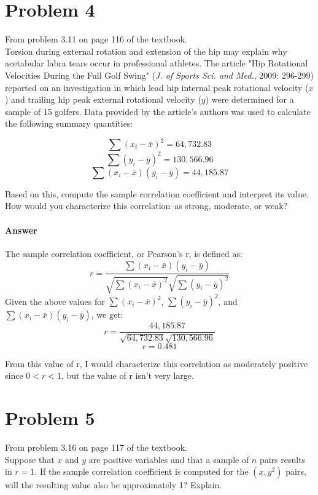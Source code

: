\documentclass{article}
\newcommand{\p}[1]{\paragraph{#1}} %
\begin{document}
\section*{Problem 4} %

	From problem 3.11 on page 116 of the textbook. \\

	Torsion during external rotation and extension of the hip may explain why acetabular labra tears 
	occur in professional athletes. The article "Hip Rotational Velocities During the Full Golf 
	Swing" (\textit{J. of Sports Sci. and Med.}, 2009: 296-299) reported on an investigation in which 
	lead hip internal peak rotational velocity ($x$) and trailing hip peak external rotational velocity 
	($y$) were determined for a sample of 15 golfers. Data provided by the article's authors was 
	used to calculate the following summary quantities:
	
	\[ \sum(x_i-\bar{x})^2 = 64,732.83 \]
	\[ \sum(y_i-\bar{y})^2 = 130,566.96 \]
	\[ \sum(x_i-\bar{x})(y_i-\bar{y}) = 44,185.87 \]
	
	Based on this, compute the sample correlation coefficient and interpret its value. How would 
	you characterize this correlation--as strong, moderate, or weak?
	
	\p{Answer} The sample correlation coefficient, or Pearson's r, is defined as:
	\[ r = \frac{\sum(x_i-\bar{x})(y_i-\bar{y})}{\sqrt{\sum(x_i-\bar{x})^2}\sqrt{\sum(y_i-\bar{y})^2}} \]
	Given the above values for $\sum(x_i-\bar{x})^2$, $\sum(y_i-\bar{y})^2$, and $\sum(x_i-\bar{x})
	(y_i-\bar{y})$, we get:
	\[ r = \frac{44,185.87}{\sqrt{64,732.83}\sqrt{130,566.96}} \]
	\[ r = 0.481 \]
	
	From this  value of r, I would characterize this correlation as moderately positive since $0 < r < 
	1$, but the value of r isn't very large.

\clearpage
\section*{Problem 5} %

	From problem 3.16 on page 117 of the textbook. \\

	Suppose that $x$ and $y$ are positive variables and that a sample of $n$ pairs results in $r = 
	1$. If the sample correlation coefficient is computed for the $(x,y^2)$ pairs, will the resulting 
	value also be approximately 1? Explain.
	
\end{document}
